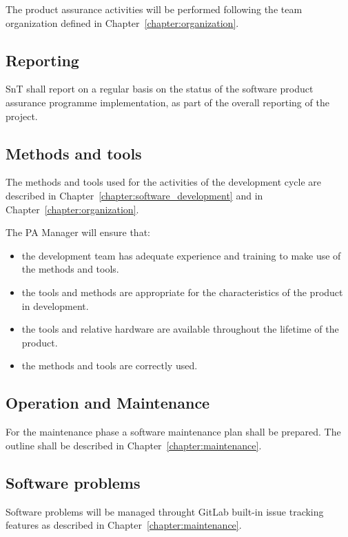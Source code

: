 The product assurance activities will be performed following the team organization defined in Chapter~\ref{chapter:organization}.

\subsection{Reporting}
SnT shall report on a regular basis on the status of the software product assurance programme implementation, as part of the overall reporting of the project.


\subsection{Methods and tools}

The methods and tools used for the activities of the development cycle are described in Chapter~\ref{chapter:software_development} and in Chapter~\ref{chapter:organization}.

The PA Manager will ensure that:
\begin{itemize}
  \item the development team has adequate experience and training to make use of  the methods and tools.
  \item the tools and methods are appropriate for the characteristics of the product in development.
  \item the tools and relative hardware are available throughout the lifetime of the product.
  \item the methods and tools are correctly used.
\end{itemize}


\subsection{Operation and Maintenance}
For the maintenance phase a software maintenance plan shall be prepared.
The outline shall be described in Chapter~\ref{chapter:maintenance}.

\subsection{Software problems}

Software problems will be managed throught GitLab built-in issue tracking features as described in Chapter~\ref{chapter:maintenance}.
